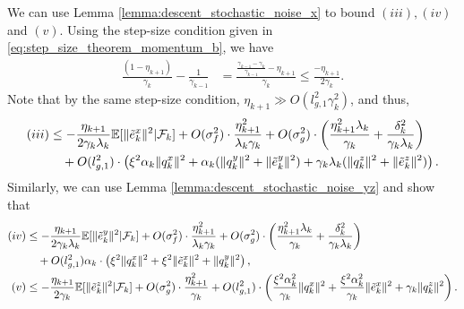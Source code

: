 We can use Lemma \ref{lemma:descent_stochastic_noise_x} to bound $(iii), (iv)$ and $(v)$. Using the step-size condition given in \eqref{eq:step_size_theorem_momentum_b}, we have
\begin{align*}
    \frac{(1-\eta_{k+1} )}{\gamma_k} - \frac{1}{\gamma_{k-1}} &= \frac{\frac{\gamma_{k-1} - \gamma_{k}}{\gamma_{k-1}} - \eta_{k+1} }{\gamma_k} \le \frac{-\eta_{k+1}}{2 \gamma_k}. 
\end{align*}
Note that by the same step-size condition, $\eta_{k+1} \gg O(l_{g,1}^2 \gamma_k^2)$, and thus, 
\begin{align*}
    (iii) &\le -\frac{\eta_{k+1}}{2 \gamma_k \lambda_k} \mathbb{E}[\|\tilde{e}_k^x\|^2 | \mathcal{F}_k] + O(\sigma_f^2) \cdot \frac{\eta_{k+1}^2}{\lambda_k \gamma_k} + O(\sigma_g^2) \cdot \left(\frac{\eta_{k+1}^2 \lambda_k}{\gamma_k} + \frac{\delta_k^2}{\gamma_k \lambda_k} \right) \\
    &\quad + O(l_{g,1}^2) \cdot \left( \xi^2 \alpha_k \|q_k^x\|^2 + \alpha_k(\|q_k^y\|^2 + \|\tilde{e}_k^y\|^2) + \gamma_k \lambda_k (\|q_k^z\|^2 + \|\tilde{e}_k^z\|^2) \right). 
\end{align*}
Similarly, we can use Lemma \ref{lemma:descent_stochastic_noise_yz} and show that
\begin{align*}
    (iv) &\le -\frac{\eta_{k+1}}{2 \gamma_k \lambda_k} \mathbb{E}[\|\tilde{e}_k^y\|^2 | \mathcal{F}_k] + O(\sigma_f^2) \cdot \frac{\eta_{k+1}^2}{\lambda_k \gamma_k} + O(\sigma_g^2) \cdot \left(\frac{\eta_{k+1}^2 \lambda_k}{\gamma_k} + \frac{\delta_k^2}{\gamma_k \lambda_k} \right) \\
    &\quad + O(l_{g,1}^2) \alpha_k \cdot \left( \xi^2 \|q_k^x\|^2 + \xi^2 \|\tilde{e}_k^x\|^2 + \|q_k^y\|^2  \right), \\
    (v) &\le -\frac{\eta_{k+1}}{2 \gamma_k} \mathbb{E}[\|\tilde{e}_k^z\|^2 | \mathcal{F}_k] + O(\sigma_g^2) \cdot \frac{\eta_{k+1}^2}{\gamma_k}  + O(l_{g,1}^2) \cdot \left( \frac{\xi^2 \alpha_k^2}{\gamma_k} \|q_k^x\|^2 + \frac{\xi^2 \alpha_k^2}{\gamma_k} \|\tilde{e}_k^x\|^2 + \gamma_k \|q_k^z\|^2  \right). 
\end{align*}


